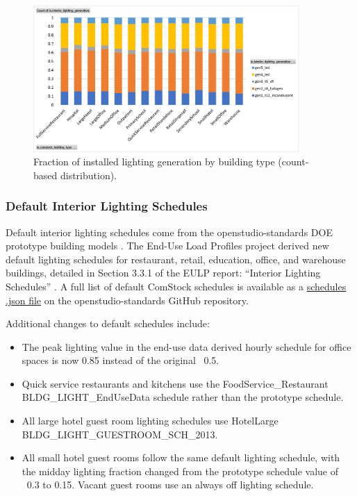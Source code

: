 \begin{figure}[ht!]
    \centering \includegraphics[width=0.9\textwidth]{figures/ltg_btype_dist.png}
    \caption[Fraction of installed lighting generation by building type]{Fraction of installed lighting generation by building type (count-based distribution).}
    \label{fig:ltg_btype_dist}
\end{figure}

\pagebreak

\subsubsection{Default Interior Lighting Schedules}
Default interior lighting schedules come from the openstudio-standards DOE prototype building models \citep{deru_2011}.  The End-Use Load Profiles project derived new default lighting schedules for restaurant, retail, education, office, and warehouse buildings, detailed in Section 3.3.1 of the EULP report: ``Interior Lighting Schedules'' \citep{eulp_final_report}. A full list of default ComStock schedules is available as a  \href{https://github.com/NREL/openstudio-standards/blob/master/lib/openstudio-standards/standards/ashrae_90_1/ashrae_90_1_2013/comstock_ashrae_90_1_2013/data/ashrae_90_1.schedules.json}{schedules .json file} on the openstudio-standards GitHub repository.

Additional changes to default schedules include:

\begin{itemize}
  \item The peak lighting value in the end-use data derived hourly schedule for office spaces is now 0.85 instead of the original ~0.5.
  \item Quick service restaurants and kitchens use the FoodService\_Restaurant BLDG\_LIGHT\_EndUseData schedule rather than the prototype schedule.
  \item All large hotel guest room lighting schedules use HotelLarge BLDG\_LIGHT\_GUESTROOM\_SCH\_2013.
  \item All small hotel guest rooms follow the same default lighting schedule, with the midday lighting fraction changed from the prototype schedule value of ~0.3 to 0.15. Vacant guest rooms use an always off lighting schedule.
\end{itemize}

